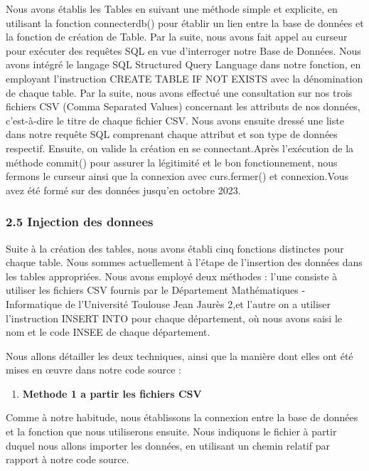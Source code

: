 \documentclass[
]{article}
\providecommand{\tightlist}{%
  \setlength{\itemsep}{0pt}\setlength{\parskip}{0pt}}
\begin{document}
Nous avons établis les Tables en suivant une méthode simple et
explicite, en utilisant la fonction connecterdb() pour établir un lien
entre la base de données et la fonction de création de Table. Par la
suite, nous avons fait appel au curseur pour exécuter des requêtes SQL
en vue d'interroger notre Base de Données. Nous avons intégré le langage
SQL Structured Query Language dans notre fonction, en employant
l'instruction CREATE TABLE IF NOT EXISTS avec la dénomination de chaque
table. Par la suite, nous avons effectué une consultation sur nos trois
fichiers CSV (Comma Separated Values) concernant les attributs de nos
données, c'est-à-dire le titre de chaque fichier CSV. Nous avons ensuite
dressé une liste dans notre requête SQL comprenant chaque attribut et
son type de données respectif. Ensuite, on valide la création en se
connectant.Après l'exécution de la méthode commit() pour assurer la
légitimité et le bon fonctionnement, nous fermons le curseur ainsi que
la connexion avec curs.fermer() et connexion.Vous avez été formé sur des
données jusqu'en octobre 2023.

\subsubsection{2.5 Injection des donnees}\label{injection-des-donnees}

Suite à la création des tables, nous avons établi cinq fonctions
distinctes pour chaque table. Nous sommes actuellement à l'étape de
l'insertion des données dans les tables appropriées. Nous avons employé
deux méthodes : l'une consiste à utiliser les fichiers CSV fournis par
le Département Mathématiques - Informatique de l'Université Toulouse
Jean Jaurès 2,et l'autre on a utiliser l'instruction INSERT INTO pour
chaque département, où nous avons saisi le nom et le code INSEE de
chaque département.

Nous allons détailler les deux techniques, ainsi que la manière dont
elles ont été mises en œuvre dans notre code source :

\begin{enumerate}
\def\labelenumi{\arabic{enumi}.}
\tightlist
\item
  \textbf{Methode 1 a partir les fichiers CSV}
\end{enumerate}

Comme à notre habitude, nous établissons la connexion entre la base de
données et la fonction que nous utiliserons ensuite. Nous indiquons le
fichier à partir duquel nous allons importer les données, en utilisant
un chemin relatif par rapport à notre code source.
\end{document}
